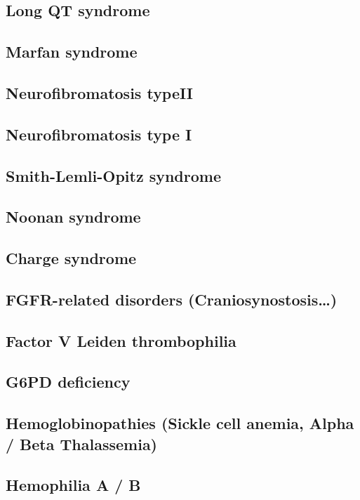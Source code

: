 \documentclass{scrartcl}
\begin{document}
\subsection{Long QT syndrome}
\label{sec:org2d5dd94}
\subsection{Marfan syndrome}
\label{sec:org9a23e16}
\subsection{Neurofibromatosis typeII}
\label{sec:org10f7a2d}
\subsection{Neurofibromatosis type I}
\label{sec:org854eed9}
\subsection{Smith-Lemli-Opitz syndrome}
\label{sec:org07a0524}
\subsection{Noonan syndrome}
\label{sec:org70d9ce7}
\subsection{Charge syndrome}
\label{sec:org81cfabf}
\subsection{FGFR-related disorders (Craniosynostosis\ldots{})}
\label{sec:org640f0d6}
\subsection{Factor V Leiden thrombophilia}
\label{sec:org863fc3c}
\subsection{G6PD deficiency}
\label{sec:org4f6711b}
\subsection{Hemoglobinopathies (Sickle cell anemia, Alpha / Beta Thalassemia)}
\label{sec:org51762a9}
\subsection{Hemophilia A / B}
\label{sec:org8d6cd07}
\end{document}
